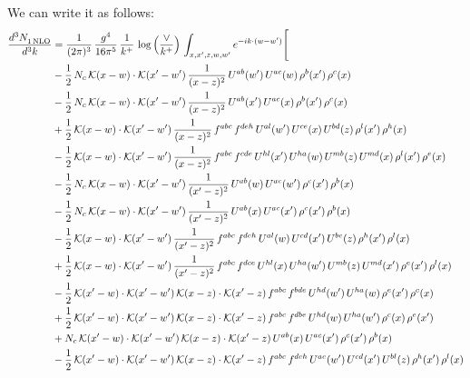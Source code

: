 \documentclass[9pt]{article}
\numberwithin{equation}{section}
\begin{document}
We can write it as follows:
\begin{align}
    \frac{d^{3}N_{1\,\rm NLO}^{\rm}}{d^{3}k}  & = \frac{1}{(2\pi)^{3}}\,\frac{g^{4}}{16\pi^{5}}\,\frac{1}{k^{+}}\,\log{\left(\frac{\vee}{k^{+}}\right)}\, \int_{x,x',z,w,w'}e^{-ik\cdot (w-w')}\Bigg[\notag\\ & 
    -\frac{1}{2}\,N_{c}\,\mathcal{K}(x-w)\cdot\mathcal{K}(x'-w')\,\frac{1}{(x-z)^{2}}\,U^{ab}(w')\,U^{ac}(w)\,\rho^{b}(x')\,\rho^{c}(x)\notag\\
&-\frac{1}{2}\,N_{c}\,\mathcal{K}(x-w)\cdot\mathcal{K}(x'-w')\,\frac{1}{(x-z)^{2}}\,U^{ab}(x')\,U^{ac}(x)\,\rho^{b}(x')\,\rho^{c}(x)\notag\\
&+\frac{1}{2}\,\mathcal{K}(x-w)\cdot\mathcal{K}(x'-w')\,\frac{1}{(x-z)^{2}}\,f^{abc}\,f^{deh}\,U^{al}(w')\,U^{ce}(x)\,U^{bd}(z)\,\rho^{l}(x')\,\rho^{h}(x)\notag\\
&-\frac{1}{2}\,\mathcal{K}(x-w)\cdot\mathcal{K}(x'-w')\,\frac{1}{(x-z)^{2}}\,f^{abc}\,f^{cde}\,U^{hl}(x')\,U^{ha}(w)\,U^{mb}(z)\,U^{md}(x)\,\rho^{l}(x')\,\rho^{e}(x)\notag \\
&-\frac{1}{2}\,N_{c}\,\mathcal{K}(x-w)\cdot\mathcal{K}(x'-w')\,\frac{1}{(x'-z)^{2}}\,U^{ab}(w)\,U^{ac}(w')\,\rho^{c}(x')\,\rho^{b}(x)\notag \\
&-\frac{1}{2}\,N_{c}\,\mathcal{K}(x-w)\cdot\mathcal{K}(x'-w')\,\frac{1}{(x'-z)^{2}}\,U^{ab}(x)\,U^{ac}(x')\,\rho^{c}(x')\,\rho^{b}(x)\notag \\
&-\frac{1}{2}\,\mathcal{K}(x-w)\cdot\mathcal{K}(x'-w')\,\frac{1}{(x'-z)^{2}}\,f^{abc}\,f^{deh}\,U^{al}(w)\,U^{cd}(x')\,U^{be}(z)\,\rho^{h}(x')\,\rho^{l}(x)\notag \\
&+\frac{1}{2}\,\mathcal{K}(x-w)\cdot\mathcal{K}(x'-w')\,\frac{1}{(x'-z)^{2}}\,f^{abc}\,f^{dce}\,U^{hl}(x)\,U^{ha}(w')\,U^{mb}(z)\,U^{md}(x')\,\rho^{e}(x')\,\rho^{l}(x)\notag \\
&-\frac{1}{2}\,\mathcal{K}(x'-w)\cdot\mathcal{K}(x'-w')\,\mathcal{K}(x-z)\cdot\mathcal{K}(x'-z)\,f^{abc}\,f^{bde}\,U^{hd}(w')\,U^{ha}(w)\,\rho^{e}(x')\,\rho^{c}(x)\notag \\
&+\frac{1}{2}\,\mathcal{K}(x'-w)\cdot\mathcal{K}(x'-w')\,\mathcal{K}(x-z)\cdot\mathcal{K}(x'-z)\,f^{abc}\,f^{dbe}\,U^{hd}(w)\,U^{ha}(w')\,\rho^{c}(x)\,\rho^{e}(x')\notag \\
&+N_{c}\,\mathcal{K}(x'-w)\cdot\mathcal{K}(x'-w')\,\mathcal{K}(x-z)\cdot\mathcal{K}(x'-z)\,U^{ab}(x)\,U^{ac}(x')\,\rho^{c}(x')\,\rho^{b}(x)\notag \\
&-\frac{1}{2}\,\mathcal{K}(x'-w)\cdot\mathcal{K}(x'-w')\,\mathcal{K}(x-z)\cdot\mathcal{K}(x'-z)\,f^{abc}\,f^{deh}\,U^{ae}(w')\,U^{cd}(x')\,U^{bl}(z)\,\rho^{h}(x')\,\rho^{l}(x)\notag \\

\end{align}
\end{document}
